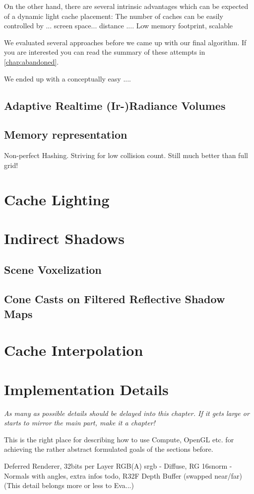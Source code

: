 \documentclass[thesis.tex]{subfiles}
\begin{document}
On the other hand, there are several intrinsic advantages which can be expected of a dynamic light cache placement:
The number of caches can be easily controlled by  ... screen space... distance ....
Low memory footprint, scalable

We evaluated several approaches before we came up with our final algorithm.
If you are interested you can read the summary of these attempts in \autoref{chap:abandoned}.

We ended up with a conceptually easy ....


\subsection{Adaptive Realtime (Ir-)Radiance Volumes}


\subsection{Memory representation}
Non-perfect Hashing. Striving for low collision count.
Still much better than full grid!

\section{Cache Lighting}


\section{Indirect Shadows}

\subsection{Scene Voxelization}

\subsection{Cone Casts on Filtered Reflective Shadow Maps}


\section{Cache Interpolation}



\section{Implementation Details}

\emph{As many as possible details should be delayed into this chapter. If it gets large or starts to mirror the main part, make it a chapter!}

This is the right place for describing how to use Compute, OpenGL etc. for achieving the rather abstract formulated goals of the sections before.

Deferred Renderer, 32bits per Layer RGB(A) srgb - Diffuse, RG 16snorm - Normals with angles, extra infos todo, R32F Depth Buffer (swapped near/far)\\
(This detail belongs more or less to Eva...)

\subfilebib %
\end{document}
